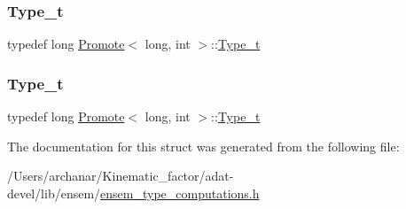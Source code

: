 \subsubsection{\texorpdfstring{Type\_t}{Type\_t}\hspace{0.1cm}{\footnotesize\ttfamily [2/3]}}
{\footnotesize\ttfamily typedef long \mbox{\hyperlink{structPromote}{Promote}}$<$ long, int $>$\+::\mbox{\hyperlink{structPromote_3_01long_00_01int_01_4_ab0ceeb6c9abec4d97d5caab44831ba92}{Type\+\_\+t}}}

\mbox{\label{structPromote_3_01long_00_01int_01_4_ab0ceeb6c9abec4d97d5caab44831ba92}} 
\subsubsection{\texorpdfstring{Type\_t}{Type\_t}\hspace{0.1cm}{\footnotesize\ttfamily [3/3]}}
{\footnotesize\ttfamily typedef long \mbox{\hyperlink{structPromote}{Promote}}$<$ long, int $>$\+::\mbox{\hyperlink{structPromote_3_01long_00_01int_01_4_ab0ceeb6c9abec4d97d5caab44831ba92}{Type\+\_\+t}}}



The documentation for this struct was generated from the following file\+:\begin{DoxyCompactItemize}
\item 
/\+Users/archanar/\+Kinematic\+\_\+factor/adat-\/devel/lib/ensem/\mbox{\hyperlink{adat-devel_2lib_2ensem_2ensem__type__computations_8h}{ensem\+\_\+type\+\_\+computations.\+h}}\end{DoxyCompactItemize}
